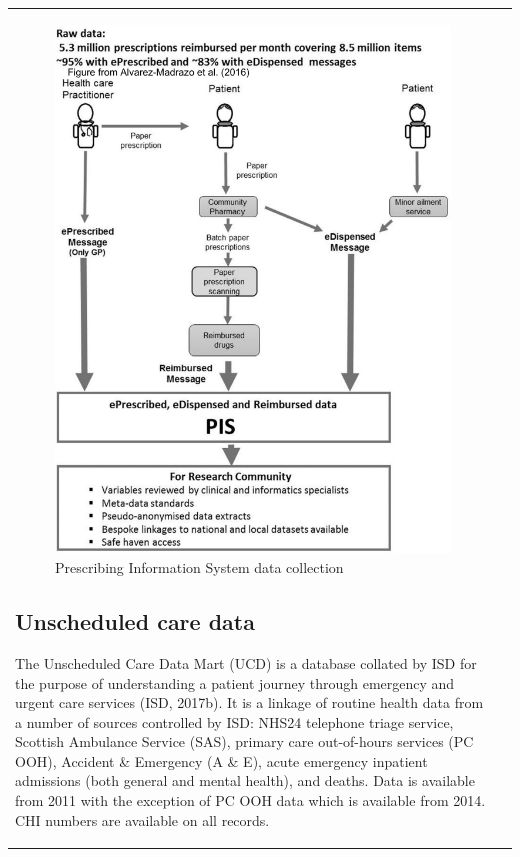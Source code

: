 \documentclass[12pt,a4paper,oneside,table]{report}
\begin{document}
\begin{tabular}[t]{ll}
\begin{figure}
  \centering
    \includegraphics{figures/chapter-methods/pis.pdf}
    \caption{Prescribing Information System data collection}
    \label{fig:methods-pis}
\end{figure}

\subsection{Unscheduled care data}\label{subsec:source-ucd}

The Unscheduled Care Data Mart (UCD) is a database collated by ISD for
the purpose of understanding a patient journey through emergency and
urgent care services (ISD, 2017b). It is a linkage of routine health
data from a number of sources controlled by ISD: NHS24 telephone triage
service, Scottish Ambulance Service (SAS), primary care out-of-hours
services (PC OOH), Accident \& Emergency (A \& E), acute emergency
inpatient admissions (both general and mental health), and deaths. Data
is available from 2011 with the exception of PC OOH data which is
available from 2014. CHI numbers are available on all records.


\end{tabular}
\end{document}
